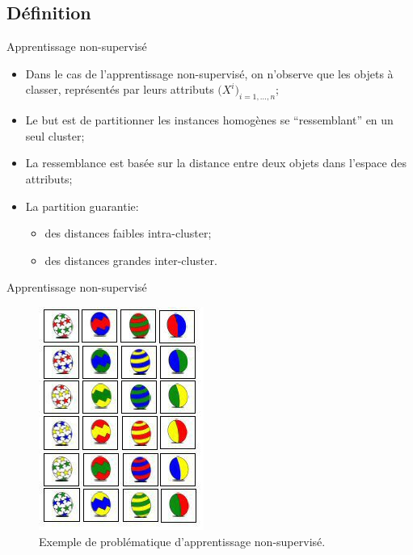 \documentclass[8pt]{beamer}
\begin{document}
		\subsection{Définition}
			\begin{frame}{Apprentissage non-supervisé}
				\begin{itemize}
					\item<1-> Dans le cas de l'apprentissage non-supervisé, on n'observe que les objets à classer, représentés par leurs attributs \(\big(X^i\big)_{i=1,\dots, n}\);
					\item<2-> Le but est de partitionner les instances homogènes se ``ressemblant'' en un seul cluster;
					\item<3-> La ressemblance est basée sur la distance entre deux objets dans l'espace des attributs;
					\item<4-> La partition guarantie:
						\begin{itemize}
							\item<5-> des distances faibles intra-cluster;
							\item<6-> des distances grandes inter-cluster.
						\end{itemize}
				\end{itemize}
			\end{frame}

			\begin{frame}{Apprentissage non-supervisé}
				\begin{figure}[H]
					\includegraphics[height=.6\textheight]{images/samples/easter_non_supervised}
					\caption*{Exemple de problématique d'apprentissage non-supervisé.}
				\end{figure}
			\end{frame}
\end{document}
